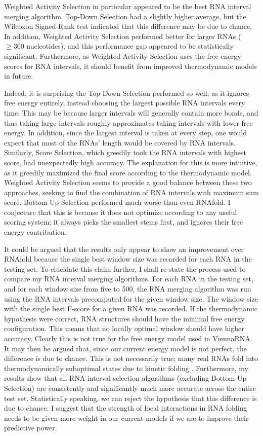 \documentclass{cshonours}
\begin{document}
Weighted Activity Selection in particular appeared to be the best RNA interval merging algorithm. Top-Down Selection had a slightly higher average, but the Wilcoxon Signed-Rank test indicated that this difference may be due to chance. In addition, Weighted Activity Selection performed better for larger RNAs ($\geq 300$ nucleotides), and this performance gap appeared to be statistically significant. Furthermore, as Weighted Activity Selection uses the free energy scores for RNA intervals, it should benefit from improved thermodynamic models in future.

Indeed, it is surprising the Top-Down Selection performed so well, as it ignores free energy entirely, instead choosing the largest possible RNA intervals every time. This may be because larger intervals will generally contain more bonds, and thus taking large intervals roughly approximates taking intervals with lower free energy. In addition, since the largest interval is taken at every step, one would expect that most of the RNAs' length would be covered by RNA intervals. Similarly, Score Selection, which greedily took the RNA intervals with highest score, had unexpectedly high accuracy. The explanation for this is more intuitive, as it greedily maximized the final score according to the thermodynamic model. Weighted Activity Selection seems to provide a good balance between these two approaches, seeking to find the combination of RNA intervals with maximum sum score. Bottom-Up Selection performed much worse than even RNAfold. I conjecture that this is because it does not optimize according to any useful scoring system; it always picks the smallest stems first, and ignores their free energy contribution.

It could be argued that the results only appear to show an improvement over RNAfold because the single best window size was recorded for each RNA in the testing set. To elucidate this claim further, I shall re-state the process used to compare my RNA interval merging algorithms. For each RNA in the testing set, and for each window size from five to 500, the RNA merging algorithm was run using the RNA intervals precomputed for the given window size. The window size with the single best F-score for a given RNA was recorded. If the thermodynamic hypothesis were correct, RNA structures should have the minimal free energy configuration. This means that no locally optimal window should have higher accuracy. Clearly this is not true for the free energy model used in ViennaRNA. It may then be argued that, since our current energy model is not perfect, the difference is due to chance. This is not necessarily true; many real RNAs fold into thermodynamically suboptimal states due to kinetic folding \cite{ditzler2008rugged, treiber2001beyond}. Furthermore, my results show that all RNA interval selection algorithms (excluding Bottom-Up Selection) are consistently and significantly much more accurate across the entire test set. Statistically speaking, we can reject the hypothesis that this difference is due to chance. I suggest that the strength of local interactions in RNA folding needs to be given more weight in our current models if we are to improve their predictive power.
\end{document}
